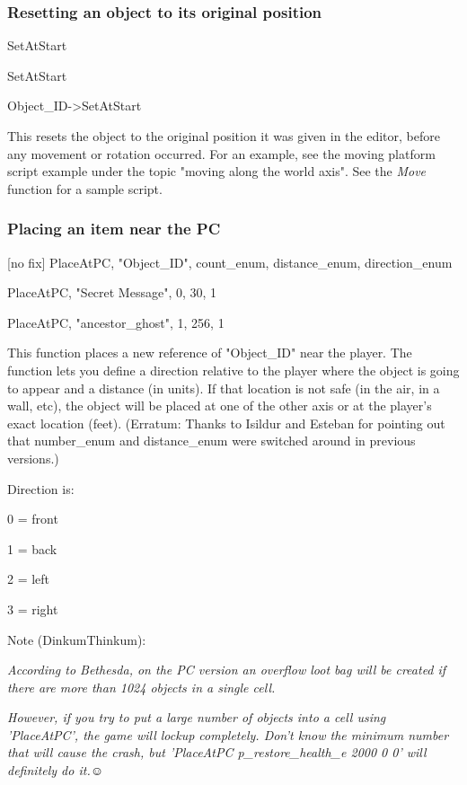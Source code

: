 \documentclass[
]{article}
\begin{document}
\hypertarget{resetting-an-object-to-its-original-position}{%
\subsubsection{Resetting an object to its original
position}\label{resetting-an-object-to-its-original-position}}

SetAtStart

SetAtStart

Object\_ID-\textgreater SetAtStart

This resets the object to the original position it was given in the
editor, before any movement or rotation occurred. For an example, see
the moving platform script example under the topic "moving along the
world axis". See the \emph{Move} function for a sample script.

\hypertarget{placing-an-item-near-the-pc}{%
\subsubsection{Placing an item near the
PC}\label{placing-an-item-near-the-pc}}

{[}no fix{]} PlaceAtPC, "Object\_ID", count\_enum, distance\_enum,
direction\_enum

PlaceAtPC, "Secret Message", 0, 30, 1

PlaceAtPC, "ancestor\_ghost", 1, 256, 1

This function places a new reference of "Object\_ID" near the player.
The function lets you define a direction relative to the player where
the object is going to appear and a distance (in units). If that
location is not safe (in the air, in a wall, etc), the object will be
placed at one of the other axis or at the player's exact location
(feet). (Erratum: Thanks to Isildur and Esteban for pointing out that
number\_enum and distance\_enum were switched around in previous
versions.)

Direction is:

0 = front

1 = back

2 = left

3 = right

Note (DinkumThinkum):

\emph{According to Bethesda, on the PC version an overflow loot bag will
be created if there are more than 1024 objects in a single cell.}

\emph{\hfill\break
However, if you try to put a large number of objects into a cell using
'PlaceAtPC', the game will lockup completely. Don't know the minimum
number that will cause the crash, but 'PlaceAtPC p\_restore\_health\_e
2000 0 0' will definitely do it.}☺
\end{document}
